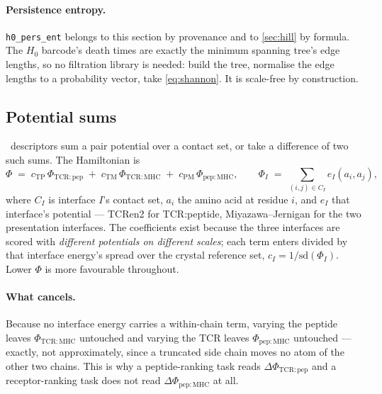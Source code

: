 \documentclass[11pt,a4paper]{article}
\newcommand{\dsc}[1]{\texttt{#1}}
\begin{document}
\paragraph{Persistence entropy.} \dsc{h0\_pers\_ent} belongs to this section by provenance and to
\cref{sec:hill} by formula. The $H_0$ barcode's death times are exactly the minimum spanning tree's
edge lengths, so no filtration library is needed: build the tree, normalise the edge lengths to a
probability vector, take \cref{eq:shannon}. It is scale-free by construction.

\subsection{Potential sums}
\label{sec:potential}

\nOpPotential\ descriptors sum a pair potential over a contact set, or take a difference of two such
sums. The Hamiltonian is
%
\begin{equation}
\Phi \;=\; c_{\mathrm{TP}}\,\Phi_{\mathrm{TCR:pep}}
       \;+\; c_{\mathrm{TM}}\,\Phi_{\mathrm{TCR:MHC}}
       \;+\; c_{\mathrm{PM}}\,\Phi_{\mathrm{pep:MHC}},
\qquad
\Phi_I \;=\; \sum_{(i,j) \in C_I} e_I(a_i, a_j),
\label{eq:phi}
\end{equation}
%
where $C_I$ is interface $I$'s contact set, $a_i$ the amino acid at residue $i$, and $e_I$ that
interface's potential --- TCRen2 for TCR:peptide, Miyazawa--Jernigan \cite{MiyazawaJernigan1996} for
the two presentation interfaces. The coefficients exist because the three interfaces are scored with
\emph{different potentials on different scales}; each term enters divided by that interface energy's
spread over the crystal reference set, $c_I = 1/\mathrm{sd}(\Phi_I)$. Lower $\Phi$ is more
favourable throughout.

\paragraph{What cancels.} Because no interface energy carries a within-chain term, varying the
peptide leaves $\Phi_{\mathrm{TCR:MHC}}$ untouched and varying the TCR leaves
$\Phi_{\mathrm{pep:MHC}}$ untouched --- exactly, not approximately, since a truncated side chain
moves no atom of the other two chains. This is why a peptide-ranking task reads
$\Delta\Phi_{\mathrm{TCR:pep}}$ and a receptor-ranking task does not read
$\Delta\Phi_{\mathrm{pep:MHC}}$ at all.
\end{document}
